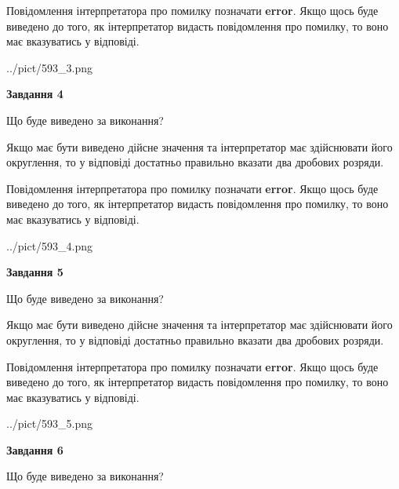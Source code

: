 \documentclass[12pt, ukrainian]{article}
\begin{document}
{\begin {Large}
Повідомлення інтерпретатора про помилку позначати \textbf{error}.
Якщо щось буде виведено до того, як інтерпретатор видасть повідомлення про помилку, 
то воно має вказуватись у відповіді. \par

\begin{center}
	{../pict/593_3.png}
\end{center}
\newpage

{\begin {center}\textbf{Завдання 4}\end {center}}\par
Що буде виведено за виконання? \par

Якщо має бути виведено дійсне значення та інтерпретатор має здійснювати його округлення, 
то у відповіді достатньо правильно вказати два дробових розряди.

Повідомлення інтерпретатора про помилку позначати \textbf{error}.
Якщо щось буде виведено до того, як інтерпретатор видасть повідомлення про помилку, 
то воно має вказуватись у відповіді. \par

\begin{center}
	{../pict/593_4.png}
\end{center}
\newpage

{\begin {center}\textbf{Завдання 5}\end {center}}\par
Що буде виведено за виконання? \par

Якщо має бути виведено дійсне значення та інтерпретатор має здійснювати його округлення, 
то у відповіді достатньо правильно вказати два дробових розряди.

Повідомлення інтерпретатора про помилку позначати \textbf{error}.
Якщо щось буде виведено до того, як інтерпретатор видасть повідомлення про помилку, 
то воно має вказуватись у відповіді. \par

\begin{center}
	{../pict/593_5.png}
\end{center}
\newpage

{\begin {center}\textbf{Завдання 6}\end {center}}\par
Що буде виведено за виконання? \par


\end{Large}}
\end{document}
